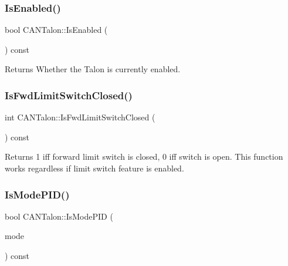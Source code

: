 \subsubsection{\texorpdfstring{Is\+Enabled()}{IsEnabled()}}
{\footnotesize\ttfamily bool C\+A\+N\+Talon\+::\+Is\+Enabled (\begin{DoxyParamCaption}{ }\end{DoxyParamCaption}) const\hspace{0.3cm}{\ttfamily [override]}}

\begin{DoxyReturn}{Returns}
Whether the Talon is currently enabled. 
\end{DoxyReturn}
\mbox{\label{class_c_a_n_talon_a892bcfbb4a6dacf4c4597703dffaf976}} 
\subsubsection{\texorpdfstring{Is\+Fwd\+Limit\+Switch\+Closed()}{IsFwdLimitSwitchClosed()}}
{\footnotesize\ttfamily int C\+A\+N\+Talon\+::\+Is\+Fwd\+Limit\+Switch\+Closed (\begin{DoxyParamCaption}{ }\end{DoxyParamCaption}) const}

\begin{DoxyReturn}{Returns}
\textquotesingle{}1\textquotesingle{} iff forward limit switch is closed, 0 iff switch is open. This function works regardless if limit switch feature is enabled. 
\end{DoxyReturn}
\mbox{\label{class_c_a_n_talon_a21e75c3f26191a40c3ed9daa4fc0eacd}} 
\subsubsection{\texorpdfstring{Is\+Mode\+P\+I\+D()}{IsModePID()}}
{\footnotesize\ttfamily bool C\+A\+N\+Talon\+::\+Is\+Mode\+P\+ID (\begin{DoxyParamCaption}\item[{C\+A\+N\+Speed\+Controller\+::\+Control\+Mode}]{mode }\end{DoxyParamCaption}) const\hspace{0.3cm}{\ttfamily [override]}}


